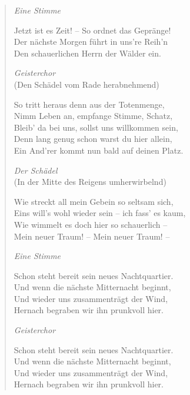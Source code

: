 \begin{verse}
\smallskip

\textit{Eine Stimme}

\smallskip

Jetzt ist es Zeit! -- So ordnet das Gepränge! \\
Der nächste Morgen führt in uns’re Reih’n \\
Den schauerlichen Herrn der Wälder ein.

\pagebreak

\textit{Geisterchor} \\
(Den Schädel vom Rade herabnehmend)

\smallskip

So tritt heraus denn aus der Totenmenge, \\
Nimm Leben an, empfange Stimme, Schatz, \\
Bleib’ da bei uns, sollst uns willkommen sein, \\
Denn lang genug schon warst du hier allein, \\
Ein And’rer kommt nun bald auf deinen Platz. 

\smallskip

\textit{Der Schädel} \\
(In der Mitte des Reigens umherwirbelnd)

\smallskip

Wie streckt all mein Gebein so seltsam sich, \\
Eins will’s wohl wieder sein -- ich fass’ es kaum, \\
Wie wimmelt es doch hier so schauerlich -- \\
Mein neuer Traum! -- Mein neuer Traum! --

\smallskip

\textit{Eine Stimme}

\smallskip

Schon steht bereit sein neues Nachtquartier. \\
Und wenn die nächste Mitternacht beginnt, \\
Und wieder uns zusammenträgt der Wind, \\
Hernach begraben wir ihn prunkvoll hier.

\smallskip

\textit{Geisterchor}

\smallskip

Schon steht bereit sein neues Nachtquartier. \\
Und wenn die nächste Mitternacht beginnt, \\
Und wieder uns zusammenträgt der Wind, \\
Hernach begraben wir ihn prunkvoll hier.


\end{verse}
